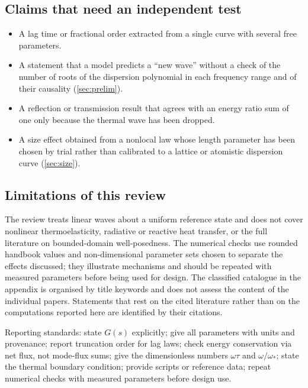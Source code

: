 \subsection{Claims that need an independent test}
\begin{itemize}
\item A lag time or fractional order extracted from a single curve with several free parameters.
\item A statement that a model predicts a ``new wave'' without a check of the number of roots of the dispersion polynomial in each frequency range and of their causality (\cref{sec:prelim}).
\item A reflection or transmission result that agrees with an energy ratio sum of one only because the thermal wave has been dropped.
\item A size effect obtained from a nonlocal law whose length parameter has been chosen by trial rather than calibrated to a lattice or atomistic dispersion curve (\cref{sec:size}).
\end{itemize}

\subsection{Limitations of this review}
The review treats linear waves about a uniform reference state and does not cover nonlinear thermoelasticity, radiative or reactive heat transfer, or the full literature on bounded-domain well-posedness. The numerical checks use rounded handbook values and non-dimensional parameter sets chosen to separate the effects discussed; they illustrate mechanisms and should be repeated with measured parameters before being used for design. The classified catalogue in the appendix is organised by title keywords and does not assess the content of the individual papers. Statements that rest on the cited literature rather than on the computations reported here are identified by their citations.

\begin{summarybox}[Summary]
Reporting standards: state $G(s)$ explicitly; give all parameters with units and provenance; report truncation order for lag laws; check energy conservation via net flux, not mode-flux sums; give the dimensionless numbers $\omega\tau$ and $\omega/\omega_*$; state the thermal boundary condition; provide scripts or reference data; repeat numerical checks with measured parameters before design use.
\end{summarybox}
